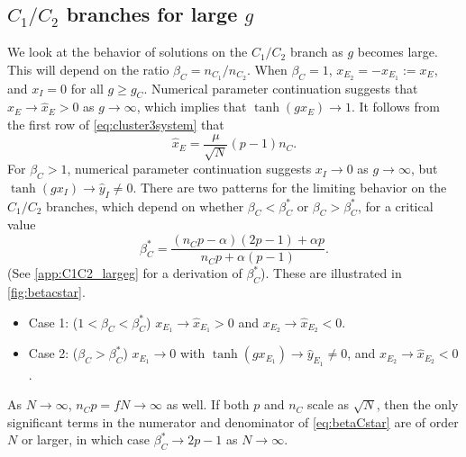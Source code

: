 \documentclass[reqno]{siamonline190516}
\begin{document}
\subsection{\texorpdfstring{$C_1/C_2$}{C1/C2} branches for large \texorpdfstring{$g$}{g}} 

We look at the behavior of solutions on the $C_1/C_2$ branch as $g$ becomes large. This will depend on the ratio $\beta_C = n_{C_1}/n_{C_2}$. When $\beta_C = 1$, $x_{E_2} = -x_{E_1} := x_E$, and $x_I = 0$ for all $g \geq g_C$. Numerical parameter continuation suggests that $x_{E} \rightarrow \hat{x}_{E} > 0$ as $g \rightarrow \infty$, which implies that $\tanh(g x_{E}) \rightarrow 1$. It follows from the first row of \cref{eq:cluster3system} that 
\begin{equation}\label{eq:xEhat}
\hat{x}_{E} = \frac{\mu}{\sqrt{N}}(p-1)n_C.
\end{equation}
For $\beta_C > 1$, numerical parameter continuation suggests $x_I \rightarrow 0$ as $g \rightarrow \infty$, but $\tanh(g x_I) \rightarrow \hat{y}_I \neq 0$. There are two patterns for the limiting behavior on the $C_1/C_2$ branches, which depend on whether $\beta_C < \beta_C^*$ or $\beta_C > \beta_C^*$, for a critical value
\begin{equation}\label{eq:betaCstar}
    \beta_C^* = \frac{(n_C p - \alpha )(2 p - 1) + \alpha p}{n_C p + \alpha(p-1)}.
\end{equation}
(See \cref{app:C1C2_largeg} for a derivation of $\beta_C^*$). These are illustrated in \cref{fig:betacstar}.
\begin{itemize}
    \item Case 1: ($1 < \beta_C < \beta_C^*$) $x_{E_1} \rightarrow \hat{x}_{E_1} > 0$ and $x_{E_2} \rightarrow \hat{x}_{E_2} < 0$. 
    \item Case 2: ($\beta_C > \beta_C^*$) $x_{E_1} \rightarrow 0$ with $\tanh(g x_{E_1}) \rightarrow \hat{y}_{E_1} \neq 0$, and $x_{E_2} \rightarrow \hat{x}_{E_2} < 0$.\\
\end{itemize}
As $N \rightarrow \infty$, $n_C p = f N \rightarrow \infty$ as well. If both $p$ and $n_C$ scale as $\sqrt{N}$, then the only significant terms in the numerator and denominator of \cref{eq:betaCstar} are of order $N$ or larger, in which case $\beta_C^* \rightarrow 2 p-1$ as $N \rightarrow \infty$. 
\end{document}

